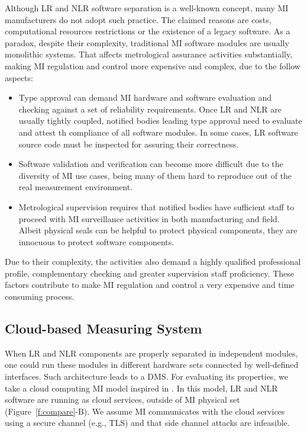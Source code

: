 \documentclass[journal]{IEEEtran} %
\begin{document}
Although LR and NLR software separation is a well-known concept, many MI manufacturers do not adopt such practice. The claimed reasons are costs, computational resources restrictions or the existence of a legacy software. As a paradox, despite their complexity, traditional MI software modules are usually monolithic systems. That affects metrological assurance activities substantially, making MI regulation and control more expensive and complex, due to the follow aspects:
 \begin{itemize} 
\item Type approval can demand MI hardware and software evaluation and checking against a set of reliability requirements. Once LR and NLR are usually tightly coupled, notified bodies leading type approval need to evaluate and attest th compliance of all software modules. In some cases, LR software source code must be inspected for assuring their correctness.
\item Software validation and verification can become more difficult due to the diversity of MI use cases, being many of them hard to reproduce out of the real measurement environment. 
\item Metrological supervision requires that notified bodies have sufficient staff to proceed with MI surveillance activities in both manufacturing and field. Albeit physical seals can be helpful to protect physical components, they are innocuous to protect software components.
 \end{itemize} 

Due to their complexity, the activities also demand a highly qualified professional profile, complementary checking and greater supervision staff proficiency. These factors contribute to make MI regulation and control a very expensive and time consuming process.

\subsection{Cloud-based Measuring System}
\label{s:mi_cloud}
When LR and NLR components are properly separated in independent modules, one could run these modules in different hardware sets connected by well-defined interfaces. Such architecture leads to a DMS. For evaluating its properties, we take a cloud computing MI model inspired in \cite{Oppermann2016}. In this model, LR and NLR software are running as cloud services, outside of MI physical set (Figure~\ref{f:compare}-B). We assume MI communicates with the cloud services using a secure channel (e.g., TLS) and that side channel attacks are infeasible.
\end{document}
